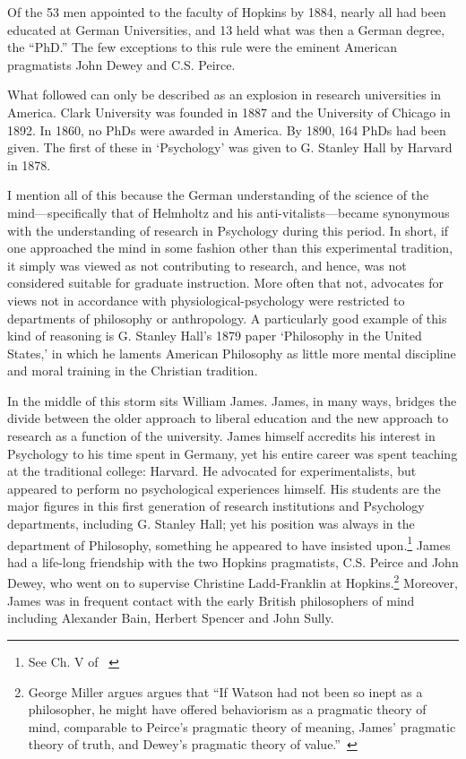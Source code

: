 \begin{refsection}
Of the 53 men appointed to the faculty of Hopkins by 1884, nearly all had been educated at German Universities, and 13 held what was then a German degree, the ``PhD.'' The few exceptions to this rule were the eminent American pragmatists John Dewey and C.S. Peirce. 

What followed can only be described as an explosion in research universities in America. Clark University was founded in 1887 and the University of Chicago in 1892. In 1860, no PhDs were awarded in America. By 1890, 164 PhDs had been given. The first of these in `Psychology' was given to G. Stanley Hall by Harvard in 1878.

I mention all of this because the German understanding of the science of the mind---specifically that of Helmholtz and his anti-vitalists---became synonymous with the understanding of research in Psychology during this period. In short, if one approached the mind in some fashion other than this experimental tradition, it simply was viewed as not contributing to research, and hence, was not considered suitable for graduate instruction. More often that not, advocates for views not in accordance with physiological-psychology were restricted to departments of philosophy or anthropology. A particularly good example of this kind of reasoning is G. Stanley Hall's 1879 paper `Philosophy in the United States,' in which he laments American Philosophy as little more mental discipline and moral training in the Christian tradition.

In the middle of this storm sits William James. James, in many ways, bridges the divide between the older approach to liberal education and the new approach to research as a function of the university. James himself accredits his interest in Psychology to his time spent in Germany, yet his entire career was spent teaching at the traditional college: Harvard. He advocated for experimentalists, but appeared to perform no psychological experiences himself. His students are the major figures in this first generation of research institutions and Psychology departments, including G. Stanley Hall; yet his position was always in the department of Philosophy, something he appeared to have insisted upon.\footnote{See Ch. V of ~\citep{Miller:1962vk}} James had a life-long friendship with the two Hopkins pragmatists, C.S. Peirce and John Dewey, who went on to supervise Christine Ladd-Franklin at Hopkins.\footnote{George Miller argues argues that ``If Watson had not been so inept as a philosopher, he might have offered behaviorism as a pragmatic theory of mind, comparable to Peirce's pragmatic theory of meaning, James' pragmatic theory of truth, and Dewey's pragmatic theory of value.''~\citep[p. 66]{Miller:1962vk}} Moreover, James was in frequent contact with the early British philosophers of mind including Alexander Bain, Herbert Spencer and John Sully. 


\end{refsection}
